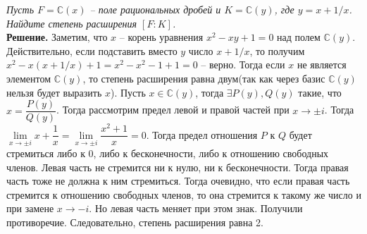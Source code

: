 \documentclass[a4paper, 12pt]{article}
\newcommand{\Co}{\mathbb{C}}
\begin{document}
\begin{spacing}{1}
\noindent \textit{Пусть $F = \Co(x)$ -- поле рациональных дробей и $K = \Co(y)$, где $y = x + 1/x$. Найдите степень расширения $[F:K]$.
}\\
\noindent \textbf{Решение.} Заметим, что $x$ -- корень уравнения $x^2-xy+1 = 0$ над полем $\Co(y)$. Действительно, если подставить вместо $y$ число $x+1/x$, то получим $x^2-x(x+1/x) + 1 = x^2-x^2-1+1 = 0$ -- верно. Тогда если $x$ не является элементом $\Co(y)$, то степень расширения равна двум(так как через базис $\Co(y)$ нельзя будет выразить $x$). Пусть $x \in \Co(y)$, тогда $\exists P(y), Q(y)$ такие, что $x = \dfrac{P(y)}{Q(y)}$. Тогда рассмотрим предел левой и правой частей при $x \to \pm i$. Тогда $\lim\limits_{x \to \pm i}x+\dfrac{1}{x} =\lim\limits_{x \to \pm i}\dfrac{x^2+1}{x} = 0$. Тогда предел отношения $P$ к $Q$ будет стремиться либо к 0, либо к бесконечности, либо к отношению свободных членов. Левая часть не стремится ни к нулю, ни к бесконечности. Тогда правая часть тоже не должна к ним стремиться. Тогда очевидно, что если правая часть стремится к отношению свободных членов, то она стремится к такому же число и при замене $x \to -i$. Но левая часть меняет при этом знак. Получили противоречие. Следовательно, степень расширения равна 2.


\end{spacing}
\end{document}
